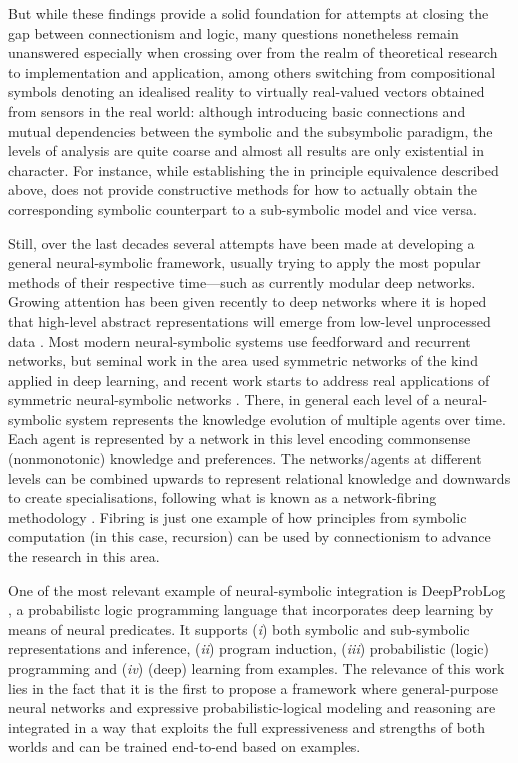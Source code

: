 But while these findings provide a solid foundation for attempts at closing the gap between connectionism and logic, many questions nonetheless remain unanswered especially when crossing over from the realm of theoretical research to implementation and application, among others switching from compositional symbols denoting an idealised reality to virtually real-valued vectors obtained from sensors in the real world: although introducing basic connections and mutual dependencies between the symbolic and the subsymbolic paradigm, the levels of analysis are quite coarse and almost all results are only existential in character. For instance, while establishing the in principle equivalence described above, \cite{Leitgeb200508189202146} does not provide constructive methods for how to actually obtain the corresponding symbolic counterpart to a sub-symbolic model and vice versa.

Still, over the last decades several attempts have been made at developing a general neural-symbolic framework, usually trying to apply the most popular methods of their respective time—such as currently modular deep networks. Growing attention has been given recently to deep networks where it is hoped that high-level abstract representations will emerge from low-level unprocessed data \cite{10.1162/neco.2006.18.7.1527}. Most modern neural-symbolic systems use feedforward and recurrent networks, but seminal work in the area used symmetric networks \cite{Pinkas1991062822913} of the kind applied in deep learning, and recent work starts to address real applications of symmetric neural-symbolic networks \cite{dePenning201001}. There, in general each level of a neural-symbolic system represents the knowledge evolution of multiple agents over time. Each agent is represented by a network in this level encoding commonsense (nonmonotonic) knowledge and preferences. The networks/agents at different levels can be combined upwards to represent relational knowledge and downwards to create specialisations, following what is known as a network-fibring methodology \cite{10.5555/1597148.1597205}. Fibring is just one example of how principles from symbolic computation (in this case, recursion) can be used by connectionism to advance the research in this area.

One of the most relevant example of neural-symbolic integration is DeepProbLog \cite{10.5555/3327144.3327291}, a probabilistc logic programming language that incorporates deep learning by means of neural predicates. It supports (\textit{i}) both symbolic and sub-symbolic representations and inference, (\textit{ii}) program induction, (\textit{iii}) probabilistic (logic) programming and (\textit{iv}) (deep) learning from examples. The relevance of this work lies in the fact that it is the first to propose a framework where general-purpose neural networks and expressive probabilistic-logical modeling and reasoning are integrated in a way that exploits the full expressiveness and strengths of both worlds and can be trained end-to-end based on examples.

